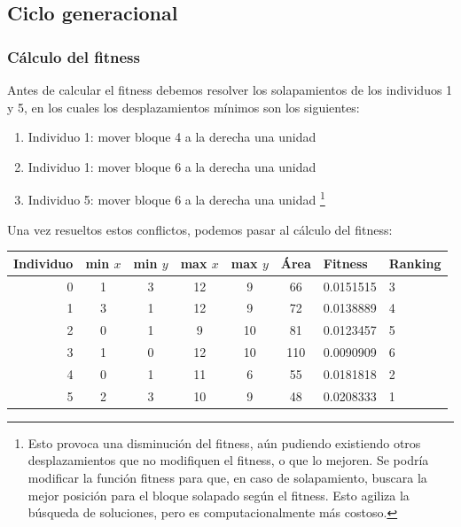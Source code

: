 \documentclass[a4paper]{article}
\begin{document}
\subsection{Ciclo generacional}
\subsubsection{Cálculo del fitness}
Antes de calcular el fitness debemos resolver los solapamientos de los individuos 1 y 5, en los cuales los desplazamientos mínimos son los siguientes:
\begin{enumerate}
\item Individuo 1: mover bloque 4 a la derecha una unidad
\item Individuo 1: mover bloque 6 a la derecha una unidad
\item Individuo 5: mover bloque 6 a la derecha una unidad \footnote{Esto provoca una disminución del fitness, aún pudiendo existiendo otros desplazamientos que no modifiquen el fitness, o que lo mejoren. Se podría modificar la función fitness para que, en caso de solapamiento, buscara la mejor posición para el bloque solapado según el fitness. Esto agiliza la búsqueda de soluciones, pero es computacionalmente más costoso.}
\end{enumerate}
Una vez resueltos estos conflictos, podemos pasar al cálculo del fitness:
\begin{center}
\begin{tabular}{r|c|c|c|c|c|l|l}
Individuo & min $x$ & min $y$ & max $x$ & max $y$ & Área & Fitness & Ranking\\ \hline
0 & 1 & 3 & 12 & 9  & 66  & 0.0151515 & 3\\
1 & 3 & 1 & 12 & 9  & 72  & 0.0138889 & 4\\
2 & 0 & 1 & 9  & 10 & 81  & 0.0123457 & 5\\
3 & 1 & 0 & 12 & 10 & 110 & 0.0090909 & 6\\
4 & 0 & 1 & 11 & 6  & 55  & 0.0181818 & 2\\
5 & 2 & 3 & 10 & 9  & 48  & 0.0208333 & 1\\
\end{tabular}
\end{center}
\end{document}
